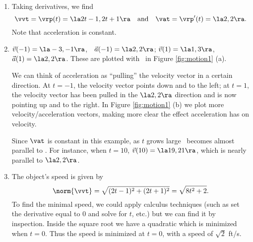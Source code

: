 {\begin{enumerate}
	\item Taking derivatives, we find
	$$\vvt = \vrp(t) =\la 2t-1,2t+1\ra \quad \text{and} \quad \vat = \vrp'(t) = \la 2,2\ra.$$
	Note that acceleration is constant.
	
	\item		$\vec v(-1) = \la -3,-1\ra$,\ \ $\vec a(-1) = \la 2,2\ra$; \quad $\vec v(1) = \la 1,3\ra$,\ \ $\vec a(1) = \la 2,2\ra$. These are plotted with \vrt\ in Figure \ref{fig:motion1} (a).
	
	We can think of acceleration as ``pulling'' the velocity vector in a certain direction. At $t=-1$, the velocity vector points down and to the left; at $t=1$, the velocity vector has been pulled in the $\la 2,2\ra$ direction and is now pointing up and to the right. In Figure \ref{fig:motion1} (b) we plot more velocity/acceleration vectors, making more clear the effect acceleration has on velocity.
	
	Since $\vat$ is constant in this example, as $t$ grows large \vvt\ becomes almost parallel to \vat. For instance, when $t=10$, $\vec v(10) = \la 19,21\ra$, which is nearly parallel to $\la 2,2\ra$.
	
	\item		The object's speed is given by 
	$$\norm{\vvt} = \sqrt{(2t-1)^2+(2t+1)^2} =\sqrt{8t^2+2}.$$ To find the minimal speed, we could apply calculus techniques (such as set the derivative equal to 0 and solve for $t$, etc.) but we can find it by inspection. Inside the square root we have a quadratic which is minimized when $t=0$. Thus the speed is minimized at $t=0$, with a speed of $\sqrt{2}$ ft/s.
	

\end{enumerate}}
